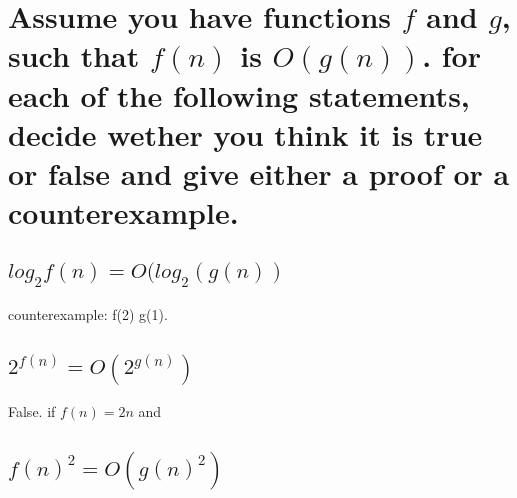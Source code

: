 \documentclass[titlepage]{article}\usepackage[]{graphicx}\usepackage[]{color}
\begin{document}
\section{ Assume you have functions $f$ and $g$, such that $f(n)$ is $O(g(n))$.
  for each of the following statements, decide wether you think it is true or false and give
either a proof or a counterexample. }

\subsection{ $log_2f(n) = O(log_2(g(n))$}

counterexample: f(2) g(1).


\subsection{ $2^{ f(n) } = O(2^{ g(n) })$}
False.
if $f(n) = 2n$ and 

\subsection{$  f(n)^2 = O(g(n)^2)$}


%
\end{document}
